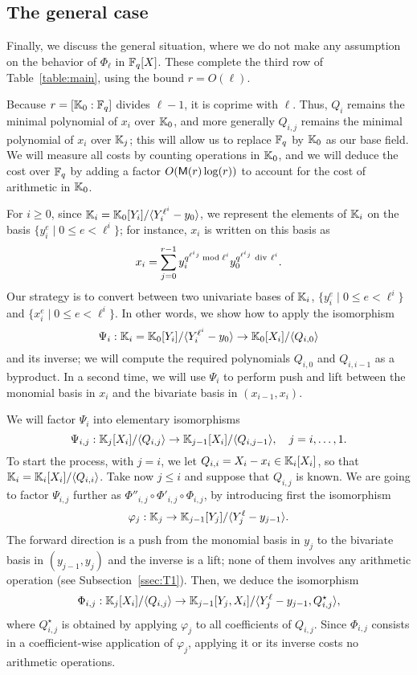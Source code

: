 \documentclass{sig-alternate}
\begin{document}
\subsection{The general case}\label{ssec:gal}

Finally, we discuss the general situation, where we do not make any
assumption on the behavior of $\Phi_\ell$ in $\mathbb{F}_q[X]$. These complete
the third row of Table~\ref{table:main}, using the bound $r=O(\ell)$.

Because $r=[\mathbb{K}_0 : \mathbb{F}_q]$ divides $\ell-1$, it is coprime with
$\ell$. Thus, $Q_i$ remains the minimal polynomial of $x_i$ over
$\mathbb{K}_0$, and more generally $Q_{i,j}$ remains the minimal polynomial of
$x_i$ over $\mathbb{K}_{j}$; this will allow us to replace $\mathbb{F}_q$ by $\mathbb{K}_0$ as
our base field. We will measure all costs by counting operations in
$\mathbb{K}_0$, and we will deduce the cost over $\mathbb{F}_q$ by adding a factor
$O(\mathsf{M}(r)\log(r))$ to account for the cost of arithmetic in $\mathbb{K}_0$.

For $i \ge 0$, since $\mathbb{K}_i=\mathbb{K}_0[Y_i]/\langle Y_i^{\ell^i}-y_0\rangle$,
we represent the elements of $\mathbb{K}_i$ on the basis $\{y_i^e \mid 0 \le e
< \ell^i\}$; for instance, $x_i$ is written on this basis as
\begin{equation}\label{eq-def:xiyi}
x_i = \sum_{j = 0}^{r-1} y_i^{q^{\ell^i j} \bmod \ell^i}
y_0^{q^{\ell^i j} {\rm~div~} \ell^i}. 
\end{equation}
Our strategy is to convert between two univariate bases of $\mathbb{K}_i$,
$\{y_i^e \mid 0 \le e < \ell^i\}$ and $\{x_i^e \mid 0 \le e <
\ell^i\}$. In other words, we show how to apply the isomorphism
$$\Psi_i: \mathbb{K}_i=\mathbb{K}_0[Y_i]/\langle Y_i^{\ell^i}-y_0\rangle \to
\mathbb{K}_0[X_i]/\langle Q_{i,0}\rangle$$ and its inverse; we will compute
the required polynomials $Q_{i,0}$ and $Q_{i,i-1}$ as a byproduct. In
a second time, we will use $\Psi_i$ to perform push and lift between
the monomial basis in $x_i$ and the bivariate basis in
$(x_{i-1},x_i)$.

We will factor $\Psi_i$ into elementary
isomorphisms
$$\Psi_{i,j}: \mathbb{K}_j[X_i]/\langle Q_{i,j}\rangle \to
\mathbb{K}_{j-1}[X_i]/\langle Q_{i,j-1}\rangle, \quad j=i,\dots,1.$$ To start
the process, with $j=i$, we let $Q_{i,i}=X_i-x_i \in \mathbb{K}_i[X_i]$, so
that $\mathbb{K}_i=\mathbb{K}_i[X_i]/\langle Q_{i,i} \rangle$.
Take now $j \le i$ and suppose that $Q_{i,j}$ is known. We are going to
factor $\Psi_{i,j}$ further as $\Phi''_{i,j} \circ \Phi'_{i,j} \circ
\Phi_{i,j}$, by introducing first the isomorphism
$$\varphi_j: \mathbb{K}_j \to \mathbb{K}_{j-1}[Y_j]/\langle Y_j^\ell-y_{j-1}\rangle.$$
The forward direction is a push from the monomial basis in $y_j$ to
the bivariate basis in $(y_{j-1},y_j)$ and the inverse is a lift; none
of them involves any arithmetic operation (see
Subsection~\ref{ssec:T1}).  Then, we deduce the isomorphism
$$\Phi_{i,j}: \mathbb{K}_j[X_i]/\langle Q_{i,j} \rangle \to
\mathbb{K}_{j-1}[Y_j,X_i]/\langle Y_j^\ell-y_{j-1}, Q^\star_{i,j}\rangle,$$
where $Q^\star_{i,j}$ is obtained by applying $\varphi_j$ to all
coefficients of $Q_{i,j}$. Since $\Phi_{i,j}$ consists in a
coefficient-wise application of $\varphi_j$, applying it or its
inverse costs no arithmetic operations.
\end{document}

